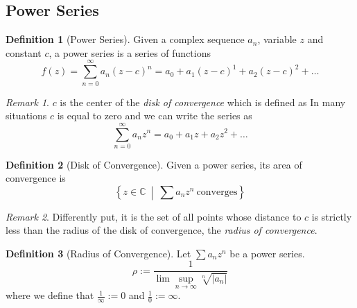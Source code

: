 \documentclass[english,titlepage]{uzhpub}
\theoremstyle{definition}
\newtheorem{definition}{Definition}[section]
\theoremstyle{plain}
\theoremstyle{remark}
\newtheorem*{remark}{Remark}
\theoremstyle{example}
\begin{document}
   \subsection{Power Series}
   \begin{definition}[Power Series]\label{def:power_series}
      Given a complex sequence \(a_n\), variable \(z\) and constant \(c\), a power series is a series of functions
      \[f(z) = \sum_{n=0}^\infty a_n (z - c)^n = a_0 + a_1(z - c)^1 + a_2(z - c)^2 + \ldots\]
   \end{definition}
   \begin{remark}
      \(c\) is the center of the \textit{disk of convergence} which is defined as
      In many situations \(c\) is equal to zero and we can write the series as
      \[\sum_{n=0}^\infty a_n z^n = a_0 + a_1z + a_2z^2 + \ldots\]
   \end{remark}

   \begin{definition}[Disk of Convergence]
      Given a power series, its area of convergence is
      \[\left\{z \in \mathbb{C}~\middle|~\sum a_n z^n~\text{converges}\right\}\]
   \end{definition}
   \begin{remark}
      Differently put, it is the set of all points whose distance to \(c\) is strictly less than the radius of the disk of convergence, the \textit{radius of convergence}.
   \end{remark}

   \begin{center}
      
   \end{center}

   \begin{definition}[Radius of Convergence]
      Let \(\sum a_n z^n\) be a power series.
      \[\rho := \frac{1}{\lim\sup_{n \to \infty} \sqrt[n]{|a_n|}}\]
      where we define that \(\frac{1}{\infty} := 0\) and \(\frac{1}{0} := \infty\).
   \end{definition}
\end{document}
